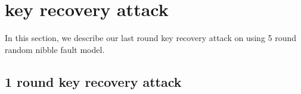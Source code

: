 %
%
%


\section{\present key recovery attack}
In this section, we describe our last round key recovery attack on  using 5 round random nibble fault model.

\subsection{1 round key recovery attack}

